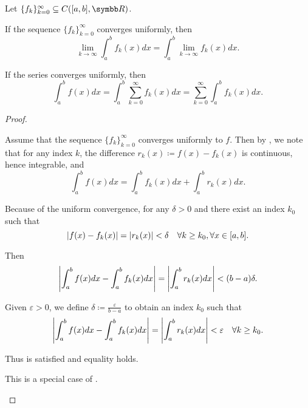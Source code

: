 \begin{corollary}\label{thm:riemann_intergral_limit_exchange}\cite[]{Фихтенгольц1968/2}
  Let \( \{ f_k \}_{k=0}^\infty \subseteq C([a, b], \BR) \).

  \begin{corenum}
     If the sequence \( \{ f_k \}_{k=0}^\infty \) converges uniformly, then
    \begin{equation*}
      \lim_{k \to \infty} \int_a^b f_k(x) dx = \int_a^b \lim_{k \to \infty} f_k(x) dx.
    \end{equation*}

     If the series  converges uniformly, then
    \begin{equation*}
      \int_a^b f(x) dx = \int_a^b \sum_{k=0}^\infty f_k(x) dx = \sum_{k=0}^\infty \int_a^b f_k(x) dx.
    \end{equation*}
  \end{corenum}
\end{corollary}
\begin{proof}\mbox{}
  \begin{description}
     Assume that the sequence \( \{ f_k \}_{k=0}^\infty \) converges uniformly to \( f \). Then by , we note that for any index \( k \), the difference \( r_k(x) \coloneqq f(x) - f_k(x) \) is continuous, hence integrable, and
    \begin{equation*}
      \int_a^b f(x) dx = \int_a^b f_k(x) dx + \int_a^b r_k(x) dx.
    \end{equation*}

    Because of the uniform convergence, for any \( \delta > 0 \) and there exist an index \( k_0 \) such that
    \begin{equation*}
      \left\vert f(x) - f_k(x) \right\vert = \left\vert r_k(x) \right\vert < \delta \quad\forall k \geq k_0, \forall x \in [a, b].
    \end{equation*}

    Then
    \begin{equation*}
      \left\vert \int_a^b f(x) dx - \int_a^b f_k(x) dx \right\vert = \left\vert \int_a^b r_k(x) dx \right\vert < (b - a) \delta.
    \end{equation*}

    Given \( \varepsilon > 0 \), we define \( \delta \coloneqq \frac \varepsilon {b - a} \) to obtain an index \( k_0 \) such that
    \begin{equation*}
      \left\vert \int_a^b f(x) dx - \int_a^b f_k(x) dx \right\vert = \left\vert \int_a^b r_k(x) dx \right\vert < \varepsilon \quad\forall k \geq k_0.
    \end{equation*}

    Thus  is satisfied and equality holds.

     This is a special case of .
  \end{description}
\end{proof}


